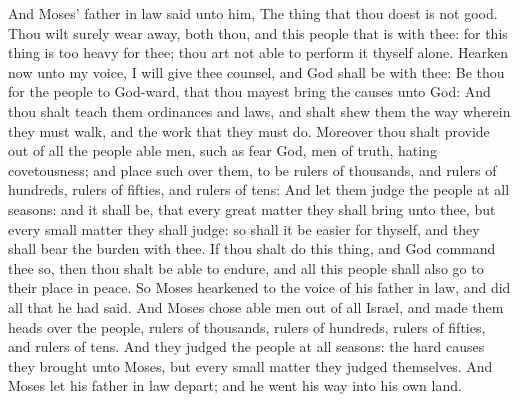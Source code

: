 \begin{biblechapter}
\verse And Moses' father in law said unto him, The thing that thou doest is not good.
\verse Thou wilt surely wear away, both thou, and this people that is with thee: for this thing is too heavy for thee; thou art not able to perform it thyself alone.
\verse Hearken now unto my voice, I will give thee counsel, and God shall be with thee: Be thou for the people to God-ward, that thou mayest bring the causes unto God:
\verse And thou shalt teach them ordinances and laws, and shalt shew them the way wherein they must walk, and the work that they must do.
\verse Moreover thou shalt provide out of all the people able men, such as fear God, men of truth, hating covetousness; and place such over them, to be rulers of thousands, and rulers of hundreds, rulers of fifties, and rulers of tens:
\verse And let them judge the people at all seasons: and it shall be, that every great matter they shall bring unto thee, but every small matter they shall judge: so shall it be easier for thyself, and they shall bear the burden with thee.
\verse If thou shalt do this thing, and God command thee so, then thou shalt be able to endure, and all this people shall also go to their place in peace.
\verse So Moses hearkened to the voice of his father in law, and did all that he had said.
\verse And Moses chose able men out of all Israel, and made them heads over the people, rulers of thousands, rulers of hundreds, rulers of fifties, and rulers of tens.
\verse And they judged the people at all seasons: the hard causes they brought unto Moses, but every small matter they judged themselves.
\verse And Moses let his father in law depart; and he went his way into his own land.
\end{biblechapter}

